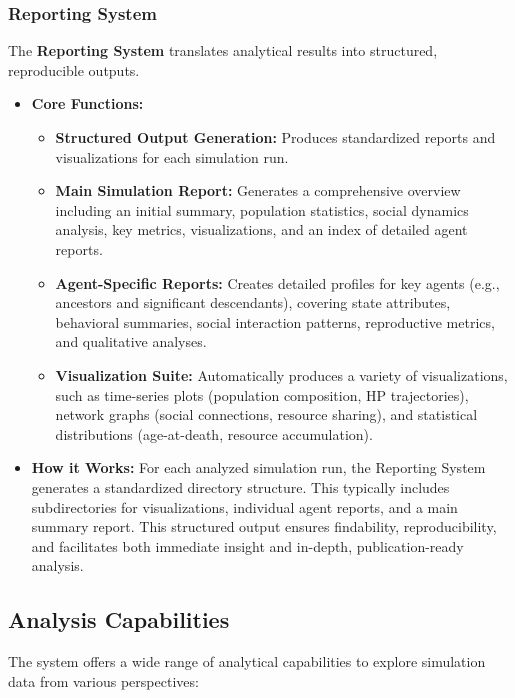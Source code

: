 \subsubsection{Reporting System}

The \textbf{Reporting System} translates analytical results into structured, reproducible outputs.

\begin{itemize}
    \item \textbf{Core Functions:}
    \begin{itemize}
        \item \textbf{Structured Output Generation:} Produces standardized reports and visualizations for each simulation run.
        \item \textbf{Main Simulation Report:} Generates a comprehensive overview including an initial summary, population statistics, social dynamics analysis, key metrics, visualizations, and an index of detailed agent reports.
        \item \textbf{Agent-Specific Reports:} Creates detailed profiles for key agents (e.g., ancestors and significant descendants), covering state attributes, behavioral summaries, social interaction patterns, reproductive metrics, and qualitative analyses.
        \item \textbf{Visualization Suite:} Automatically produces a variety of visualizations, such as time-series plots (population composition, HP trajectories), network graphs (social connections, resource sharing), and statistical distributions (age-at-death, resource accumulation).
    \end{itemize}
    \item \textbf{How it Works:}
    For each analyzed simulation run, the Reporting System generates a standardized directory structure. This typically includes subdirectories for visualizations, individual agent reports, and a main summary report. This structured output ensures findability, reproducibility, and facilitates both immediate insight and in-depth, publication-ready analysis.
\end{itemize}

\subsection{Analysis Capabilities}

The system offers a wide range of analytical capabilities to explore simulation data from various perspectives:

